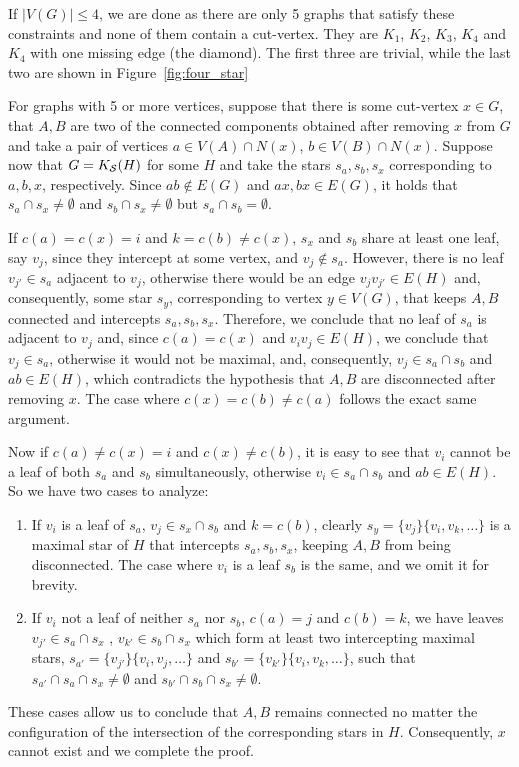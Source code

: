 \begin{tproof}
    If $|V(G)| \leq 4$, we are done as there are only 5 graphs that satisfy these constraints and none of them contain a cut-vertex.
    They are $K_1$, $K_2$, $K_3$, $K_4$ and $K_4$ with one missing edge (the diamond).
    The first three are trivial, while the last two are shown in Figure~\ref{fig:four_star}
    
    For graphs with 5 or more vertices, suppose that there is some cut-vertex $x \in G$, that $A,B$ are two of the connected components obtained after removing $x$ from $G$ and take a pair of vertices $a \in V(A) \cap N(x)$, $b \in V(B) \cap N(x)$.
    Suppose now that $G = K_{\mathcal{S}}(H)$ for some $H$ and take the stars $s_a, s_b, s_x$ corresponding to $a, b, x$, respectively.
    Since $ab \notin E(G)$ and $ax, bx \in E(G)$, it holds that $s_a \cap s_x \neq \emptyset$ and $s_b \cap s_x \neq \emptyset$ but $s_a \cap s_b = \emptyset$.
    
    If $c(a) = c(x) = i$ and $k = c(b) \neq c(x)$, $s_x$ and $s_b$ share at least one leaf, say $v_j$, since they intercept at some vertex, and $v_j \notin s_a$.
    However, there is no leaf $v_{j'} \in s_a$ adjacent to $v_j$, otherwise there would be an edge $v_jv_{j'} \in E(H)$ and, consequently, some star $s_y$, corresponding to vertex $y \in V(G)$, that keeps $A,B$ connected and intercepts $s_a, s_b, s_x$.
    Therefore, we conclude that no leaf of $s_a$ is adjacent to $v_j$ and, since $c(a) = c(x)$ and $v_iv_j \in E(H)$, we conclude that $v_j \in s_a$, otherwise it would not be maximal, and, consequently, $v_j \in s_a \cap s_b$ and $ab \in E(H)$, which contradicts the hypothesis that $A,B$ are disconnected after removing $x$.
    The case where $c(x) = c(b) \neq c(a)$ follows the exact same argument.
    
    Now if $c(a) \neq c(x) = i$ and $c(x) \neq c(b)$, it is easy to see that $v_i$ cannot be a leaf of both $s_a$ and $s_b$ simultaneously, otherwise $v_i \in s_a \cap s_b$ and $ab \in E(H)$.
    So we have two cases to analyze:
    \begin{enumerate}
        \item If $v_i$ is a leaf of $s_a$, $v_j \in s_x \cap s_b$ and $k = c(b)$, clearly $s_y = \{v_j\}\{v_i, v_k, \dots \}$ is a maximal star of $H$ that intercepts $s_a, s_b, s_x$, keeping $A,B$ from being disconnected.
        The case where $v_i$ is a leaf $s_b$ is the same, and we omit it for brevity.
        \item If $v_i$ not a leaf of neither $s_a$ nor $s_b$, $c(a) = j$ and $c(b) = k$, we have leaves $v_{j'} \in s_a \cap s_x$ , $v_{k'} \in s_b \cap s_x$ which form at least two intercepting maximal stars, $s_{a'} = \{v_{j'}\}\{v_i, v_j, \dots\}$ and $s_{b'} = \{v_{k'}\}\{v_i, v_k, \dots\}$, such that $s_{a'} \cap s_a \cap s_x \neq \emptyset$ and $s_{b'} \cap s_b \cap s_x \neq \emptyset$.
    \end{enumerate}
    
    These cases allow us to conclude that $A,B$ remains connected no matter the configuration of the intersection of the corresponding stars in $H$.
    Consequently, $x$ cannot exist and we complete the proof.
\end{tproof}


